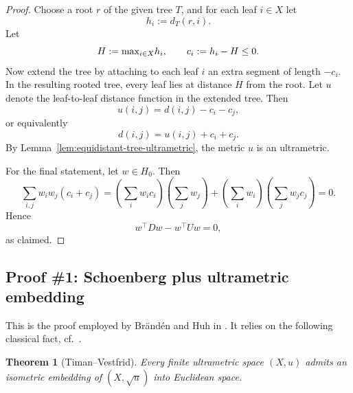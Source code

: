 \documentclass[12pt]{amsart}
\newtheorem{theorem}{Theorem}[section]
\theoremstyle{definition}
\newcommand{\1}{\mathbf{1}}
\renewcommand\max{\textup{max}}
\begin{document}
\begin{proof}
Choose a root $r$ of the given tree $T$, and for each leaf $i\in X$ let
\[
h_i:=d_T(r,i).
\]
Let
\[
H:=\max_{i\in X} h_i,
\qquad
c_i:=h_i-H\le 0.
\]
Now extend the tree by attaching to each leaf $i$ an extra segment of length
$-c_i$.  In the resulting rooted tree, every leaf lies at distance $H$ from the root.
Let $u$ denote the leaf-to-leaf distance function in the extended tree.  Then
\[
u(i,j)=d(i,j)-c_i-c_j,
\]
or equivalently
\[
d(i,j)=u(i,j)+c_i+c_j.
\]
By Lemma~\ref{lem:equidistant-tree-ultrametric}, the metric $u$ is an ultrametric.

For the final statement, let $w\in H_0$.  Then
\[
\sum_{i,j} w_i w_j(c_i+c_j)
=
\left(\sum_i w_i c_i\right)\left(\sum_j w_j\right)
+
\left(\sum_i w_i\right)\left(\sum_j w_j c_j\right)
=0.
\]
Hence
\[
w^\top D w-w^\top U w=0,
\]
as claimed.
\end{proof}

\subsection{Proof \#1: Schoenberg plus ultrametric embedding}
\label{app:schoenberg-proof}

This is the proof employed by Br\"and\'en and Huh in \cite{Branden-Huh20}.
It relies on the following classical fact, cf.~\cite{TimanVestfrid}.

\begin{theorem}[Timan--Vestfrid]
\label{thm:Timan-Vestfrid}
Every finite ultrametric space $(X,u)$ admits an isometric embedding of
$(X,\sqrt u)$ into Euclidean space.
\end{theorem}
\end{document}
